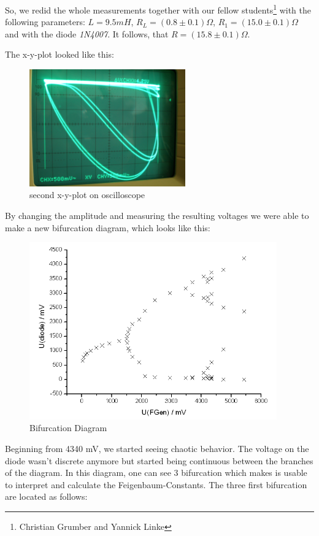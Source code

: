 So, we redid the whole measurements together with our fellow students\footnote{Christian Grumber and Yannick Linke} with the following parameters: $L = 9.5 mH$, $R_L=(0.8\pm 0.1)\Omega$, $R_1=(15.0 \pm 0.1) \Omega$ and with the diode \emph{1N4007}. It follows, that $R = (15.8 \pm 0.1) \Omega$.

The x-y-plot looked like this:

\begin{figure}[H]
\centering \includegraphics[width= 0.6\textwidth]{Fotos2/01.JPG}
\caption{second x-y-plot on oscilloscope}
\end{figure}

By changing the amplitude and measuring the resulting voltages we were able to make a new bifurcation diagram, which looks like this:

\begin{figure}[H]
\centering \includegraphics[width= 0.95\textwidth]{Bilder/bifdiag.png}
\caption{Bifurcation Diagram}
\end{figure}

Beginning from 4340 mV, we started seeing chaotic behavior. The voltage on the diode wasn't discrete anymore but started being continuous between the branches of the diagram. In this diagram, one can see 3 bifurcation which makes is usable to interpret and calculate the Feigenbaum-Constants. The three first bifurcation are located as follows:

